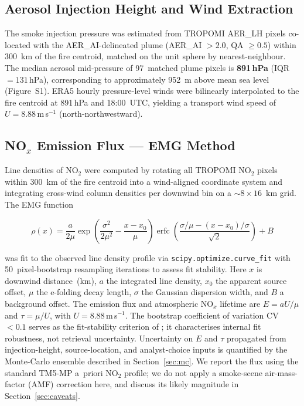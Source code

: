 \documentclass[draft]{agujournal2019}
\newcommand{\NOx}{NO$_x$}
\newcommand{\NOtwo}{NO$_2$}
\newcommand{\hPa}{\,hPa}
\newcommand{\ms}{\,m\,s$^{-1}$}
\begin{document}
\subsection{Aerosol Injection Height and Wind Extraction}
\label{sec:aerlh}

The smoke injection pressure was estimated from TROPOMI AER\_LH pixels co-located with the AER\_AI-delineated plume (AER\_AI $> 2.0$, QA $\geq 0.5$) within 300~km of the fire centroid, matched on the unit sphere by nearest-neighbour. The median aerosol mid-pressure of 97~matched plume pixels is \textbf{891\hPa{}} (IQR $= 131$\hPa), corresponding to approximately 952~m above mean sea level (Figure~S1). ERA5 hourly pressure-level winds \citep{Hersbach2020} were bilinearly interpolated to the fire centroid at 891\hPa{} and 18:00~UTC, yielding a transport wind speed of $U = \mathbf{8.88}$\ms{} (north-northwestward).

\subsection{\NOx{} Emission Flux --- EMG Method}
\label{sec:emg}

Line densities of \NOtwo{} were computed by rotating all TROPOMI \NOtwo{} pixels within 300~km of the fire centroid into a wind-aligned coordinate system and integrating cross-wind column densities per downwind bin on a $\sim 8 \times 16$~km grid. The EMG function

\begin{equation}
  \rho(x) = \frac{a}{2\mu}
    \exp\!\left(\frac{\sigma^2}{2\mu^2} - \frac{x - x_0}{\mu}\right)
    \operatorname{erfc}\!\left(\frac{\sigma/\mu - (x-x_0)/\sigma}{\sqrt{2}}\right)
    + B
  \label{eq:emg}
\end{equation}

\noindent was fit to the observed line density profile via \texttt{scipy.optimize.curve\_fit} with 50~pixel-bootstrap resampling iterations to assess fit stability. Here $x$ is downwind distance~(km), $a$ the integrated line density, $x_0$ the apparent source offset, $\mu$ the e-folding decay length, $\sigma$ the Gaussian dispersion width, and $B$ a background offset. The emission flux and atmospheric \NOx{} lifetime are $E = aU/\mu$ and $\tau = \mu/U$, with $U = 8.88$\ms{}. The bootstrap coefficient of variation CV~$< 0.1$ serves as the fit-stability criterion of \citet{Jin2021}; it characterises internal fit robustness, not retrieval uncertainty. Uncertainty on $E$ and $\tau$ propagated from injection-height, source-location, and analyst-choice inputs is quantified by the Monte-Carlo ensemble described in Section~\ref{sec:mc}. We report the flux using the standard TM5-MP a~priori \NOtwo{} profile; we do not apply a smoke-scene air-mass-factor (AMF) correction here, and discuss its likely magnitude in Section~\ref{sec:caveats}.
\end{document}
